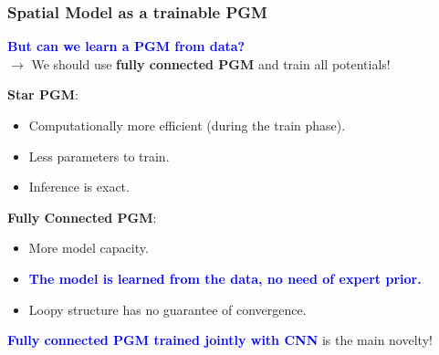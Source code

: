 \documentclass{beamer}
\newcommand\blue[1]{\textcolor{blue}{\textbf{#1}}}
\begin{document}
    
    \begin{frame}[t]
    	\frametitle{Spatial Model as a trainable PGM}
    	\begin{center}
    		\blue{But can we learn a PGM from data?} \\
    		$\rightarrow$ We should use \textbf{fully connected PGM} and train all potentials!
    		
    	\end{center}
    	
    	\begin{flushleft}
    		\textbf{Star PGM}:\\
    		\begin{itemize}
    			\item Computationally more efficient (during the train phase).\\
    			\item Less parameters to train.\\
    			\item Inference is exact.\\
    		\end{itemize}
    		\textbf{Fully Connected PGM}:\\
    		\begin{itemize}
    			\item More model capacity.\\
    			\item \blue{The model is learned from the data, no need of expert prior.}\\
    			\item Loopy structure has no guarantee of convergence.
    		\end{itemize}
    		
    		\blue{Fully connected PGM trained jointly with CNN} is the main novelty!
    	\end{flushleft}
    \end{frame}
    
\end{document}
